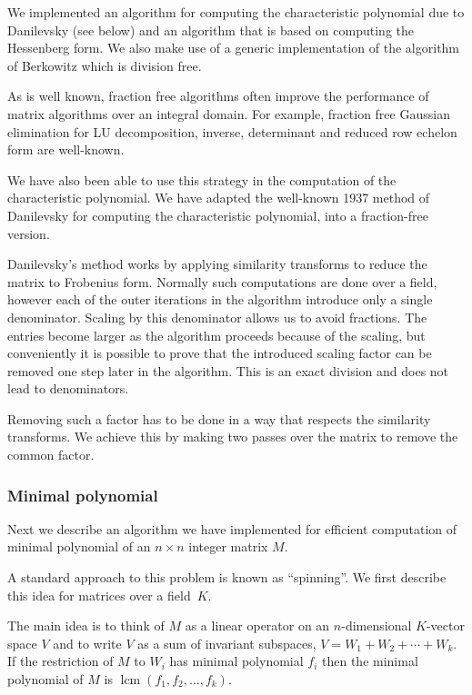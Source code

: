 \documentclass{sig-alternate-05-2015}
\DeclareMathOperator{\lcm}{lcm}
\begin{document}
We implemented an algorithm for computing the characteristic polynomial due to
Danilevsky (see below) and an algorithm that is based on computing the Hessenberg
form. We also make use of a generic implementation of the algorithm of Berkowitz which
is division free. 

As is well known, fraction free algorithms often improve the performance of matrix
algorithms over an integral domain. For example, fraction free Gaussian elimination
for LU decomposition, inverse, determinant and reduced row echelon form
are well-known.

We have also been able to use this strategy in the computation
of the characteristic polynomial. We have adapted the well-known 1937 method
of Danilevsky for computing the characteristic polynomial, into a fraction-free
version.

Danilevsky's method works by applying similarity transforms to reduce the
matrix to Frobenius form. Normally such computations are done over a
field, however each of the outer iterations in the algorithm introduce only
a single denominator. Scaling by this denominator allows us to avoid
fractions.
The entries become larger
as the algorithm proceeds because of the scaling, but conveniently
it is possible to prove that the introduced scaling factor can be removed 
one step later in the algorithm. This is an exact division and does not
lead to denominators.

Removing such a factor has to be done in a way that respects the
similarity transforms. We achieve this by making two passes over the matrix
to remove the common factor.

\subsubsection{Minimal polynomial}

Next we describe an algorithm we have implemented for efficient
computation of minimal polynomial of an $n\times n$ integer matrix $M$.

A standard approach to this problem is known as ``spinning''. 
We first describe this idea for matrices over a field~$K$.

The main idea is to think of $M$ as a linear operator on an $n$-dimensional
$K$-vector space $V$ and to write $V$ as a sum of invariant subspaces, 
$V = W_1 + W_2 + \cdots + W_k$. If the restriction of $M$ to $W_i$ has
minimal polynomial $f_i$ then the minimal polynomial of $M$ is
$\lcm(f_1, f_2, \ldots, f_k)$.
\end{document}
